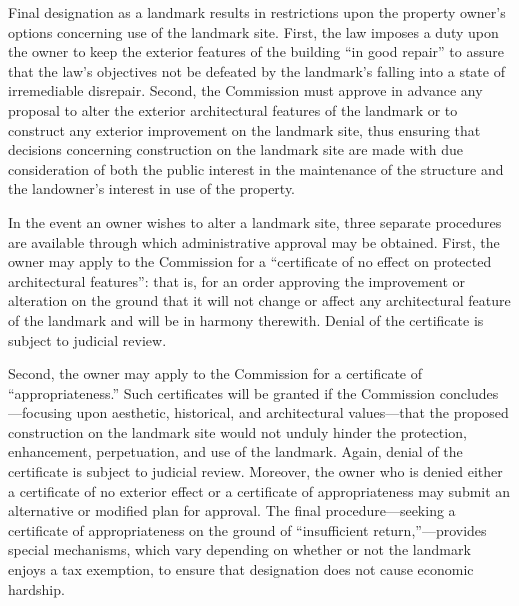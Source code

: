 Final designation as a landmark results in restrictions upon the property
owner's options concerning use of the landmark site. First, the law imposes a
duty upon the owner to keep the exterior features of the building ``in good
repair'' to assure that the law's objectives not be defeated by the landmark's
falling into a state of irremediable disrepair. Second, the Commission must
approve in advance any proposal to alter the exterior architectural features of
the landmark or to construct any exterior improvement on the landmark site, thus
ensuring that decisions concerning construction on the landmark site are made
with due consideration of both the public interest in the maintenance of the
structure and the landowner's interest in use of the property. 

In the event an owner wishes to alter a landmark site, three separate procedures
are available through which administrative approval may be obtained. First, the
owner may apply to the Commission for a ``certificate of no effect on protected
architectural features'': that is, for an order approving the improvement or
alteration on the ground that it will not change or affect any architectural
feature of the landmark and will be in harmony therewith. Denial of the
certificate is subject to judicial review.

Second, the owner may apply to the Commission for a certificate of
``appropriateness.'' Such certificates will be granted if the Commission
concludes---focusing upon aesthetic, historical, and architectural values---that
the proposed construction on the landmark site would not unduly hinder the
protection, enhancement, perpetuation, and use of the landmark. Again, denial of
the certificate is subject to judicial review. Moreover, the owner who is denied
either a certificate of no exterior effect or a certificate of appropriateness
may submit an alternative or modified plan for approval. The final
procedure---seeking a certificate of appropriateness on the ground of
``insufficient return,''---provides special mechanisms, which vary depending on
whether or not the landmark enjoys a tax exemption, to ensure that designation
does not cause economic hardship.

